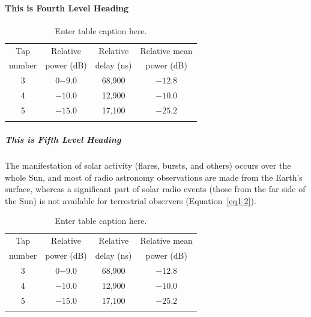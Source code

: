 \paragraph{This is Fourth Level Heading}

\lipsum[5]

\begin{table}
\caption{Enter table caption here.\label{tab1-1}}{%
\begin{tabular}{@{}cccc@{}}
\toprule
Tap     &Relative   &Relative   &Relative mean\\
number  &power (dB) &delay (ns) &power (dB)\\
\midrule
3 &0$-9.0$  &68,900\footnotemark[1] &$-12.8$\\
4 &$-10.0$ &12,900\footnotemark[2] &$-10.0$\\
5 &$-15.0$ &17,100 &$-25.2$\\
\botrule
\end{tabular}}{
}
\end{table}

\subparagraph{This is Fifth Level Heading}

\lipsum[6]

The manifestation of solar activity (flares, bursts, and others) occurs over the whole Sun, and most of radio astronomy observations are made from the Earth's surface, whereas a significant part of solar radio events (those from the far side of the Sun) is not available for terrestrial observers (Equation~\ref{eq1-2}).

\begin{table}
\caption{Enter table caption here.\label{tab1-2}}{%
\begin{tabular}{@{}cccc@{}}
\toprule
Tap     &Relative   &Relative   &Relative mean\\
number  &power (dB) &delay (ns) &power (dB)\\
\midrule
3 &0$-9.0$  &68,900\footnotemark[1] &$-12.8$\\
4 &$-10.0$ &12,900\footnotemark[2] &$-10.0$\\
5 &$-15.0$ &17,100 &$-25.2$\\
\botrule
\end{tabular}}{
}
\end{table}

